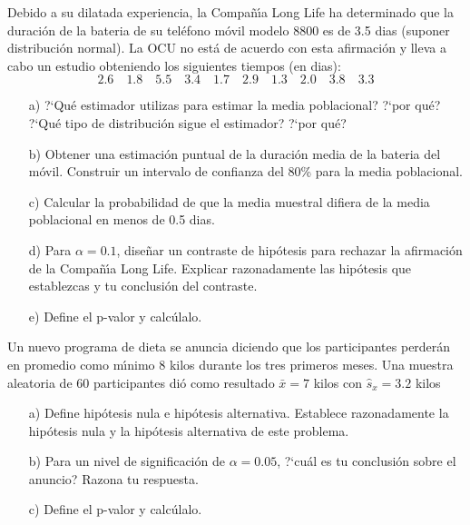 \begin{prob}
    Debido a su dilatada experiencia, la Compa\~{n}\'{\i}a Long Life ha
    determinado que la duraci\'on de la bateria de su tel\'efono m\'ovil
    modelo 8800 es de 3.5 dias (suponer distribuci\'on normal).
    La OCU no est\'a de acuerdo con esta afirmaci\'on y lleva a cabo
    un estudio obteniendo los siguientes tiempos (en dias):
    $$2.6 \quad 1.8 \quad 5.5 \quad 3.4 \quad 1.7 \quad 2.9
    \quad 1.3 \quad 2.0 \quad 3.8 \quad 3.3$$
    \begin{itemize}
        \item  [a)]  ?`Qu\'e estimador utilizas para estimar la media
        poblacional? ?`por qu\'e? ?`Qu\'e tipo de distribuci\'on
        sigue el estimador? ?`por qu\'e?

    \item  [b)] Obtener una estimaci\'on puntual de la duraci\'on media
    de la bateria del m\'ovil. Construir un intervalo de confianza del
    80\% para la media poblacional.

        \item  [c)] Calcular la probabilidad de que la media muestral
        difiera de la media poblacional en menos de 0.5 dias.

        \item  [d)] Para $\alpha = 0.1$, dise\~{n}ar un contraste de
        hip\'otesis para rechazar la afirmaci\'on de la Compa\~{n}\'{\i}a
    Long Life. Explicar razonadamente las hip\'otesis que establezcas y
    tu conclusi\'on del contraste.

    \item  [e)] Define el p-valor y calc\'ulalo.
    \end{itemize}
\end{prob}

\begin{prob}
    Un nuevo programa de dieta se anuncia diciendo que los
    participantes perder\'an en promedio como m\'{\i}nimo 8 kilos
    durante los tres primeros meses. Una muestra aleatoria de 60
    participantes di\'o como resultado $\bar{x} = 7$
    kilos con $\hat{s}_{x} = 3.2$ kilos
    \begin{itemize}
    \item  [a)] Define hip\'otesis nula e hip\'otesis alternativa.
    Establece razonadamente la hip\'otesis nula y la hip\'otesis
        alternativa de este problema.

        \item  [b)] Para un nivel de significaci\'on de $\alpha =
        0.05$, ?`cu\'al es tu conclusi\'on sobre el anuncio? Razona
        tu respuesta.

    \item  [c)] Define el p-valor y calc\'ulalo.
    \end{itemize}
\end{prob}
